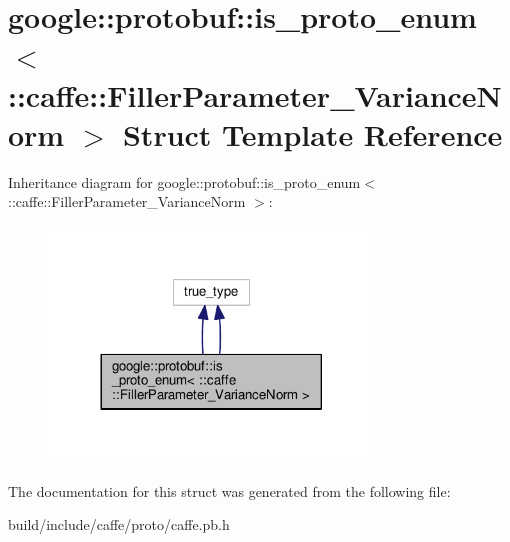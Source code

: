 \hypertarget{structgoogle_1_1protobuf_1_1is__proto__enum_3_01_1_1caffe_1_1_filler_parameter___variance_norm_01_4}{}\section{google\+:\+:protobuf\+:\+:is\+\_\+proto\+\_\+enum$<$ \+:\+:caffe\+:\+:Filler\+Parameter\+\_\+\+Variance\+Norm $>$ Struct Template Reference}
\label{structgoogle_1_1protobuf_1_1is__proto__enum_3_01_1_1caffe_1_1_filler_parameter___variance_norm_01_4}


Inheritance diagram for google\+:\+:protobuf\+:\+:is\+\_\+proto\+\_\+enum$<$ \+:\+:caffe\+:\+:Filler\+Parameter\+\_\+\+Variance\+Norm $>$\+:
\nopagebreak
\begin{figure}[H]
\begin{center}
\leavevmode
\includegraphics[width=245pt]{structgoogle_1_1protobuf_1_1is__proto__enum_3_01_1_1caffe_1_1_filler_parameter___variance_norm_01_4__inherit__graph}
\end{center}
\end{figure}


The documentation for this struct was generated from the following file\+:\begin{DoxyCompactItemize}
\item 
build/include/caffe/proto/caffe.\+pb.\+h\end{DoxyCompactItemize}
